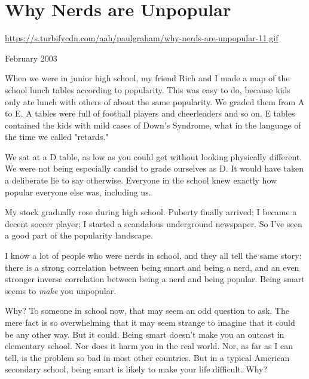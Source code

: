 \chapter{Why Nerds are Unpopular}


            
              
                \href{https://s.turbifycdn.com/aah/paulgraham/why-nerds-are-unpopular-11.gif}{https://s.turbifycdn.com/aah/paulgraham/why-nerds-are-unpopular-11.gif}



February 2003

When we were in junior high school,
                  my friend Rich and I made a map of the school lunch tables
                  according to popularity. This was easy to do, because kids
                  only ate lunch with others of about the same popularity. We
                  graded them from A to E. A tables were full of football
                  players and cheerleaders and so on. E tables contained the
                  kids with mild cases of Down's Syndrome, what in the language
                  of the time we called "retards."

We sat at a D
                  table, as low as you could get without looking physically
                  different. We were not being especially candid to grade
                  ourselves as D. It would have taken a deliberate lie to say
                  otherwise. Everyone in the school knew exactly how popular
                  everyone else was, including us.

My stock gradually
                  rose during high school. Puberty finally arrived; I became a
                  decent soccer player; I started a scandalous underground
                  newspaper. So I've seen a good part of the popularity
                  landscape.

I know a lot of people who were nerds in
                  school, and they all tell the same story: there is a strong
                  correlation between being smart and being a nerd, and an even
                  stronger inverse correlation between being a nerd and being
                  popular. Being smart seems to \emph{make} you unpopular.

Why?
                  To someone in school now, that may seem an odd question to
                  ask. The mere fact is so overwhelming that it may seem strange
                  to imagine that it could be any other way. But it could. Being
                  smart doesn't make you an outcast in elementary school. Nor
                  does it harm you in the real world. Nor, as far as I can tell,
                  is the problem so bad in most other countries. But in a
                  typical American secondary school, being smart is likely to
                  make your life difficult. Why?




